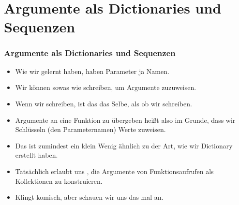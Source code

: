 \documentclass[aspectratio=169,mathserif,notheorems]{beamer}%
\begin{document}
\section{Argumente als Dictionaries und Sequenzen}%
%
\begin{frame}%
\frametitle{Argumente als Dictionaries und Sequenzen}%
\begin{itemize}%
%
\item Wie wir gelernt haben, haben Parameter ja Namen.%
%
\item<2-> Wir können sowas wie  schreiben, um Argumente zuzuweisen.%
%
\item<3-> Wenn wir  schreiben, ist das das Selbe, als ob wir  schreiben.%
%
\item<4-> Argumente an eine Funktion zu übergeben heißt also im Grunde, dass wir Schlüsseln (den Parameternamen) Werte zuweisen.%
%
\item<5-> Das ist zumindest ein klein Wenig ähnlich zu der Art, wie wir Dictionary  erstellt haben.%
%
\item<6-> Tatsächlich erlaubt uns \python, die Argumente von Funktionsaufrufen als Kollektionen zu konstruieren.%
%
\item<7-> Klingt komisch, aber schauen wir uns das mal an.%
%
\end{itemize}%
\end{frame}%
%
%
\end{document}

